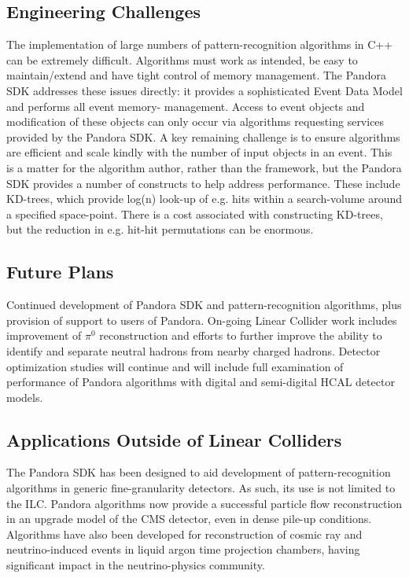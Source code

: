 \subsection{Engineering Challenges}
The implementation of large numbers of pattern-recognition algorithms in C++ can
be extremely difficult. Algorithms must work as intended, be easy to
maintain/extend and have tight control of memory management. The Pandora SDK
addresses these issues directly: it provides a sophisticated Event Data Model
and performs all event memory- management. Access to event objects and
modification of these objects can only occur via algorithms requesting services
provided by the Pandora SDK. A key remaining challenge is to ensure algorithms
are efficient and scale kindly with the number of input objects in an event.
This is a matter for the algorithm author, rather than the framework, but the
Pandora SDK provides a number of constructs to help address performance. These
include KD-trees, which provide log(n) look-up of e.g. hits within a
search-volume around a specified space-point. There is a cost associated with
constructing KD-trees, but the reduction in e.g. hit-hit permutations can be
enormous.

\subsection{Future Plans}
Continued development of Pandora SDK and pattern-recognition algorithms, plus
provision of support to users of Pandora. On-going Linear Collider work includes improvement
of $\pi^0$ reconstruction and efforts to further improve the ability to identify and
separate neutral hadrons from nearby charged hadrons. Detector optimization
studies will continue and will include full examination of performance of
Pandora algorithms with digital and semi-digital HCAL detector models.

\subsection{Applications Outside of Linear Colliders}
The Pandora SDK has been designed to aid development of pattern-recognition
algorithms in generic fine-granularity detectors. As such, its use is not
limited to the ILC. Pandora algorithms now provide a successful particle flow
reconstruction in an upgrade model of the CMS detector, even in dense pile-up
conditions. Algorithms have also been developed for reconstruction of cosmic ray
and neutrino-induced events in liquid argon time projection chambers, having
significant impact in the neutrino-physics community.

